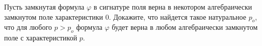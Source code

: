 Пусть замкнутая формула $\varphi$ в сигнатуре поля верна в некотором алгебраически замкнутом поле
характеристики $0$. Докажите, что найдется такое натуральное $p_o$, что для любого $p > p_o$ формула
$\varphi$ будет верна в любом алгебраически замкнутом поле с характеристикой $p$.
